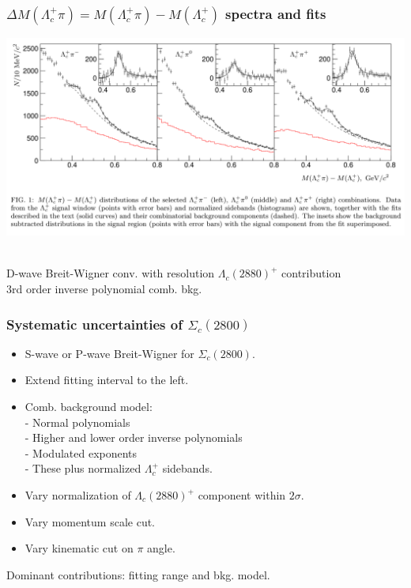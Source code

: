 \documentclass[10pt, aspectratio=169]{beamer}
\def\Lc{{\Lambda_c^+}}
\def\LcIII{{\Lambda_c(2880)^+}}
\def\ScIII{{\Sigma_c(2800)}}
\begin{document}
\begin{frame}[label=fit-sc2800]%
  \frametitle{$\Delta M(\Lc\pi) = M(\Lc\pi) - M(\Lc)$ spectra and fits}
  \centering
  \parbox{.8\linewidth}{
    \includegraphics[width=\linewidth]{figures/005/fig1-001}
  } \parbox{.19\linewidth}{
  }
  \\[1ex] \hfill
  D-wave Breit-Wigner conv. with resolution
  \hfill
  $\LcIII$ contribution
  \hfill \null
  \\[1ex] \hfill
  3rd order inverse polynomial comb. bkg.
  \hfill \null
\end{frame}%

\begin{frame}[label=systematics-sc2800]%
  \frametitle{Systematic uncertainties of $\ScIII$}
  \large

  \begin{itemize}
    \item S-wave or P-wave Breit-Wigner for $\ScIII$.
    \item Extend fitting interval to the left.
    \item Comb. background model:
      \\-  Normal polynomials
      \\-  Higher and lower order inverse polynomials
      \\-  Modulated exponents
      \\-  These plus normalized $\Lc$ sidebands.
    \item Vary normalization of $\LcIII$ component within $2\sigma$.
    \item Vary momentum scale cut.
    \item Vary kinematic cut on $\pi$ angle.
  \end{itemize}

  Dominant contributions: fitting range and bkg. model.
\end{frame}%
\end{document}
